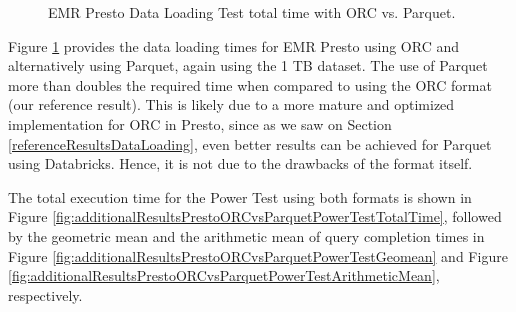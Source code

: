 \begin{figure}
   \begin{center}
   \end{center}
   \caption{EMR Presto Data Loading Test total time with ORC vs. Parquet.}
   \label{fig:additionalResultsPrestoORCvsParquetDataLoading}
\end{figure}

Figure \ref{fig:additionalResultsPrestoORCvsParquetDataLoading} provides the data loading times for EMR Presto using ORC and alternatively using Parquet, again using the 1 TB dataset. The use of Parquet more than doubles the required time when compared to using the ORC format (our reference result). This is likely due to a more mature and optimized implementation for ORC in Presto, since as we saw on Section \ref{referenceResultsDataLoading}, even better results can be achieved for Parquet using Databricks. Hence, it is not due to the drawbacks of the format itself.

The total execution time for the Power Test using both formats is shown in Figure \ref{fig:additionalResultsPrestoORCvsParquetPowerTestTotalTime}, followed by the geometric mean and the arithmetic mean of query completion times in Figure \ref{fig:additionalResultsPrestoORCvsParquetPowerTestGeomean} and Figure \ref{fig:additionalResultsPrestoORCvsParquetPowerTestArithmeticMean}, respectively.

